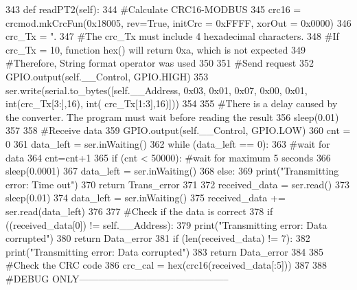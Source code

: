 \begin{DoxyCode}
343     \textcolor{keyword}{def }readPT2(self):
344         \textcolor{comment}{#Calculate CRC16-MODBUS
}
345         crc16 = crcmod.mkCrcFun(0x18005, rev=\textcolor{keyword}{True}, initCrc = 0xFFFF, xorOut = 0x0000)
346         crc\_Tx = \textcolor{stringliteral}{".%
347         \textcolor{comment}{#The crc\_Tx must include 4 hexadecimal characters.
}
348         \textcolor{comment}{#If crc\_Tx =  10, function hex() will return 0xa, which is not expected
}
349         \textcolor{comment}{#Therefore, String format operator was used
}
350     
351         \textcolor{comment}{#Send request
}
352         GPIO.output(self.\_\_Control, GPIO.HIGH)
353         ser.write(serial.to\_bytes([self.\_\_Address, 0x03, 0x01, 0x07, 0x00, 0x01, int(crc\_Tx[3:],16), int(
      crc\_Tx[1:3],16)]))
354     
355         \textcolor{comment}{#There is a delay caused by the converter. The program must wait before reading the result
}
356         sleep(0.01)
357     
358         \textcolor{comment}{#Receive data
}
359         GPIO.output(self.\_\_Control, GPIO.LOW)
360         cnt = 0
361         data\_left = ser.inWaiting()
362         \textcolor{keywordflow}{while} (data\_left == 0):
363             \textcolor{comment}{#wait for data
}
364             cnt=cnt+1
365             \textcolor{keywordflow}{if} (cnt < 50000): \textcolor{comment}{#wait for maximum 5 seconds
}
366                 sleep(0.0001)
367                 data\_left = ser.inWaiting()
368             \textcolor{keywordflow}{else}:
369                 print(\textcolor{stringliteral}{"Transmitting error: Time out"})
370                 \textcolor{keywordflow}{return} Trans\_error
371     
372         received\_data = ser.read()
373         sleep(0.01)
374         data\_left = ser.inWaiting()
375         received\_data += ser.read(data\_left)
376         
377         \textcolor{comment}{#Check if the data is correct
}
378         \textcolor{keywordflow}{if} ((received\_data[0]) != self.\_\_Address):
379             print(\textcolor{stringliteral}{"Transmitting error: Data corrupted"})
380             \textcolor{keywordflow}{return} Data\_error
381         \textcolor{keywordflow}{if} (len(received\_data) != 7):
382             print(\textcolor{stringliteral}{"Transmitting error: Data corrupted"})
383             \textcolor{keywordflow}{return} Data\_error
384         
385         \textcolor{comment}{#Check the CRC code
}
386         crc\_cal = hex(crc16(received\_data[:5]))
387 
388         \textcolor{comment}{#DEBUG ONLY-----------------------------------------------
}}
\end{DoxyCode}
